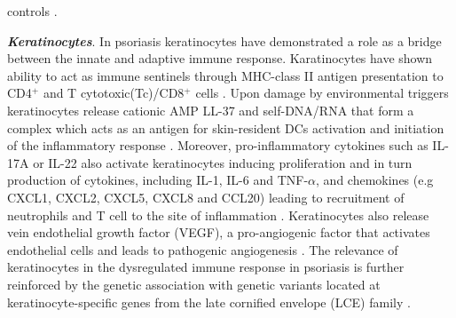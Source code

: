 controls \parencite{Cai2012, Dolcino2015}. %


\textbf{\textit{Keratinocytes}}. In psoriasis keratinocytes have demonstrated a role as a bridge between the innate and adaptive immune response. Karatinocytes have shown ability to act as immune sentinels through MHC-class II antigen presentation to CD4$^+$ and T cytotoxic(Tc)/CD8$^+$ cells \parencite{Black2007}. Upon damage by environmental triggers keratinocytes release cationic AMP LL-37 and self-DNA/RNA that form a complex which acts as an antigen for skin-resident DCs activation and initiation of the inflammatory response \parencite{Lande2007}. Moreover, pro-inflammatory cytokines such as IL-17A or IL-22 also activate keratinocytes inducing proliferation and in turn production of cytokines, including IL-1, IL-6 and TNF-$\alpha$, and chemokines (e.g CXCL1, CXCL2, CXCL5, CXCL8 and CCL20) leading to recruitment of neutrophils and T cell to the site of inflammation \parencite{Feldmeyer2007, Arend2008, Nestle2009, Nestle2005}. Keratinocytes also release vein endothelial growth factor (VEGF), a pro-angiogenic factor that activates endothelial cells and leads to pathogenic angiogenesis \parencite{Xia2003}. The relevance of keratinocytes in the dysregulated immune response in psoriasis is further reinforced by the genetic association with genetic variants located at keratinocyte-specific genes from the late cornified envelope (LCE) family \parencite{Tsoi2012}. 


